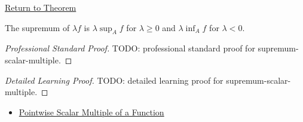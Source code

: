 \newpage
{}
\label{prf:supremum-scalar-multiple}

\begin{remark*}[Return]
\hyperref[thm:supremum-scalar-multiple]{Return to Theorem}
\end{remark*}

\begin{theorem*}
The supremum of \(\lambda f\) is \(\lambda\sup_A f\) for \(\lambda\geq0\) and \(\lambda\inf_A f\) for \(\lambda<0\).
\end{theorem*}

\begin{proof}[Professional Standard Proof]
\LRAProofBodyStart
TODO: professional standard proof for supremum-scalar-multiple.
\end{proof}

\begin{proof}[Detailed Learning Proof]
\LRAProofBodyStart
TODO: detailed learning proof for supremum-scalar-multiple.
\end{proof}

\begin{remark*}
\end{remark*}

\begin{dependencies}
\begin{itemize}
  \item \hyperref[def:pointwise-scalar-multiple-of-a-function]{Pointwise Scalar Multiple of a Function}
\end{itemize}
\end{dependencies}

\clearpage
